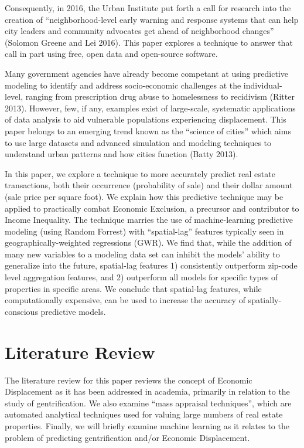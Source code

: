 \documentclass[]{article}
\begin{document}
Consequently, in 2016, the Urban Institute put forth a call for research
into the creation of ``neighborhood-level early warning and response
systems that can help city leaders and community advocates get ahead of
neighborhood changes'' (Solomon Greene and Lei 2016). This paper
explores a technique to answer that call in part using free, open data
and open-source software.

Many government agencies have already become competant at using
predictive modeling to identify and address socio-economic challenges at
the individual-level, ranging from prescription drug abuse to
homelessness to recidivism (Ritter 2013). However, few, if any, examples
exist of large-scale, systematic applications of data analysis to aid
vulnerable populations experiencing displacement. This paper belongs to
an emerging trend known as the ``science of cities'' which aims to use
large datasets and advanced simulation and modeling techniques to
understand urban patterns and how cities function (Batty 2013).

In this paper, we explore a technique to more accurately predict real
estate transactions, both their occurrence (probability of sale) and
their dollar amount (sale price per square foot). We explain how this
predictive technique may be applied to practically combat Economic
Exclusion, a precursor and contributor to Income Inequality. The
technique marries the use of machine-learning predictive modeling (using
Random Forrest) with ``spatial-lag'' features typically seen in
geographically-weighted regressions (GWR). We find that, while the
addition of many new variables to a modeling data set can inhibit the
models' ability to generalize into the future, spatial-lag features 1)
consistently outperform zip-code level aggregation features, and 2)
outperform all models for specific types of properties in specific
areas. We conclude that spatial-lag features, while computationally
expensive, can be used to increase the accuracy of spatially-conscious
predictive models.

\section{Literature Review}\label{literature-review}

The literature review for this paper reviews the concept of Economic
Displacement as it has been addressed in academia, primarily in relation
to the study of gentrification. We also examine ``mass appraisal
techniques'', which are automated analytical techniques used for valuing
large numbers of real estate properties. Finally, we will briefly
examine machine learning as it relates to the problem of predicting
gentrification and/or Economic Displacement.
\end{document}
